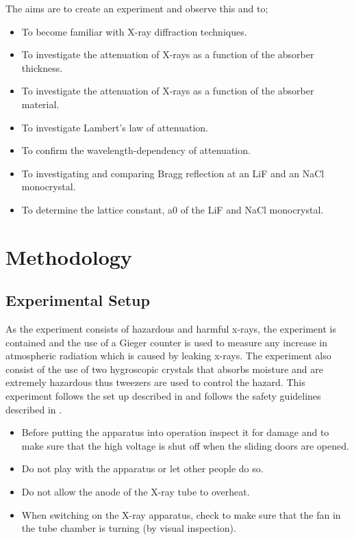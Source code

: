 \documentclass[12pt]{article}
\begin{document}
The aims are to create an experiment and observe this and to; \cite{Exp.D-2020}
\begin{itemize}
    \item To become familiar with X-ray diffraction techniques.
    \item To investigate the attenuation of X-rays as a function of the absorber thickness.
    \item To investigate the attenuation of X-rays as a function of the absorber material.
    \item To investigate Lambert’s law of attenuation.
    \item To confirm the wavelength-dependency of attenuation.
    \item To investigating and comparing Bragg reflection at an LiF and an NaCl monocrystal.
    \item To determine the lattice constant, a0 of the LiF and NaCl monocrystal.
\end{itemize}

\section{Methodology}
\label{Methodology Section}

\subsection{Experimental Setup}
\label{Experimental Setup Subsection}

As the experiment consists of hazardous and harmful x-rays, the experiment is contained and the use of a Gieger counter is used to measure any increase in atmospheric radiation which is caused by leaking x-rays. The experiment also consist of the use of two hygroscopic crystals that absorbs moisture and are extremely hazardous thus tweezers are used to control the hazard. This experiment follows the set up described in \cite{Exp.D-2020} and follows the safety guidelines described in \cite{Exp.D-2020}. \\

\begin{itemize}
    \item Before putting the apparatus into operation inspect it for damage and to make sure that the high voltage is shut off when the sliding doors are opened.
    \item Do not play with the apparatus or let other people do so.
    \item Do not allow the anode of the X-ray tube to overheat.
    \item When switching on the X-ray apparatus, check to make sure that the fan in the tube chamber is turning (by visual inspection).
\end{itemize}
\end{document}

